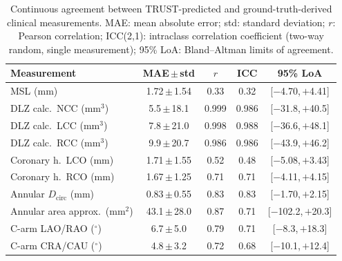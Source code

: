 \documentclass[conference]{IEEEtran}
\begin{document}
\begin{table}[t]
\centering
\caption{Continuous agreement between TRUST-predicted and ground-truth-derived clinical measurements. MAE: mean absolute error; std: standard deviation; $r$: Pearson correlation; ICC(2,1): intraclass correlation coefficient (two-way random, single measurement); 95\% LoA: Bland--Altman limits of agreement.}
\label{tab:clinical_continuous}
\setlength{\tabcolsep}{2pt}
\footnotesize
\begin{tabular}{l c c c c}
\toprule
Measurement & MAE\,$\pm$\,std & $r$ & ICC & 95\% LoA \\
\midrule
MSL (mm)                  & 1.72\,$\pm$\,1.54 & 0.33 & 0.32 & [$-$4.70,\,$+$4.41] \\
DLZ calc.\ NCC (mm$^3$)   & 5.5\,$\pm$\,18.1  & 0.999 & 0.986 & [$-$31.8,\,$+$40.5]   \\
DLZ calc.\ LCC (mm$^3$)   & 7.8\,$\pm$\,21.0 & 0.998 & 0.988 & [$-$36.6,\,$+$48.1]   \\
DLZ calc.\ RCC (mm$^3$)   & 9.9\,$\pm$\,20.7 & 0.986 & 0.986 & [$-$43.9,\,$+$46.2]   \\
Coronary h.\ LCO (mm)     & 1.71\,$\pm$\,1.55 & 0.52 & 0.48 & [$-$5.08,\,$+$3.43] \\
Coronary h.\ RCO (mm)     & 1.67\,$\pm$\,1.25 & 0.71 & 0.71 & [$-$4.11,\,$+$4.15] \\
Annular $D_{\text{circ}}$ (mm)   & 0.83\,$\pm$\,0.55 & 0.83 & 0.83 & [$-$1.70,\,$+$2.15] \\
Annular area approx.\ (mm$^2$) & 43.1\,$\pm$\,28.0 & 0.87 & 0.71 & [$-$102.2,\,$+$20.3] \\
C-arm LAO/RAO ($^\circ$)  & 6.7\,$\pm$\,5.0 & 0.79 & 0.71 & [$-$8.3,\,$+$18.3] \\
C-arm CRA/CAU ($^\circ$)  & 4.8\,$\pm$\,3.2 & 0.72 & 0.68 & [$-$10.1,\,$+$12.4]   \\
\bottomrule
\end{tabular}
\end{table}
\end{document}
